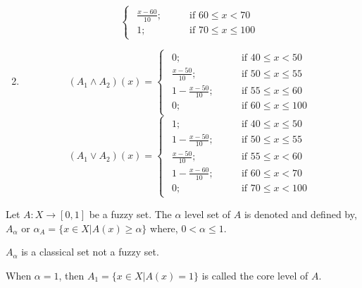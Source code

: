 \documentclass[../main-sheet.tex]{subfiles}
\begin{document}
\begin{ex}
\begin{enumerate}
\[\begin{cases}
\begin{aligned}
                    \frac{x-60}{10}; \qquad&\text{if }60\leq x<70\\
                    1; \qquad&\text{if }70\leq x\leq 100
                \end{aligned}
            \end{cases}
            \]
        \item 
        \[
            (A_1\wedge A_2)(x)=\begin{cases}
                \begin{aligned}
                    0; \qquad&\text{if }40\leq x<50\\
                    \frac{x-50}{10}; \qquad&\text{if }50\leq x\leq 55\\
                    1-\frac{x-50}{10}; \qquad&\text{if }55\leq x\leq 60\\
                    0; \qquad&\text{if }60\leq x\leq 100
                \end{aligned}
            \end{cases}
            \]
        \[
            (A_1\vee A_2)(x)=\begin{cases}
                \begin{aligned}
                    1; \qquad&\text{if }40\leq x\leq 50\\
                    1-\frac{x-50}{10}; \qquad&\text{if }50\leq x\leq 55\\
                    \frac{x-50}{10}; \qquad&\text{if }55\leq x< 60\\
                    1-\frac{x-60}{10}; \qquad&\text{if }60\leq x< 70\\
                    0; \qquad&\text{if }70\leq x< 100
                \end{aligned}
            \end{cases}
            \]
\end{enumerate}
\end{ex}
\begin{defn}
    Let \(A :X\to [0,1]\) be a fuzzy set. The \(\alpha\) level set of \(A \) is denoted and defined by, \(A_\alpha\) or \(\alpha_A=\{x\in X|A(x)\geq \alpha\}\) where, \(0<\alpha\leq 1\).
\end{defn}
\begin{rem}
    \(A_\alpha\) is a classical set not a fuzzy set.
\end{rem}
\newpage
\begin{defn}
    When \(\alpha=1\), then \(A_1=\{x\in X|A(x)=1\}\) is called the core level of \(A \).
\end{defn}
\end{document}
